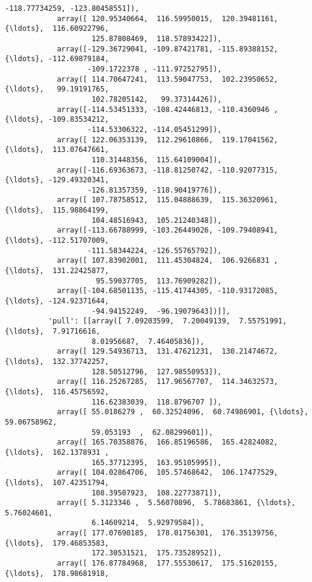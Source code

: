 \documentclass[11pt]{article}
\begin{document}
\begin{Verbatim}[commandchars=\\\{\}]
                   -118.77734259, -123.80458551]),
            array([ 120.95340664,  116.59950015,  120.39481161, {\ldots},  116.60922796,
                    125.87808469,  118.57893422]),
            array([-129.36729041, -109.87421781, -115.89388152, {\ldots}, -112.69879184,
                   -109.1722378 , -111.97252795]),
            array([ 114.70647241,  113.59047753,  102.23950652, {\ldots},   99.19191765,
                    102.78205142,   99.37314426]),
            array([-114.53451333, -108.42446813, -110.4360946 , {\ldots}, -109.83534212,
                   -114.53306322, -114.05451299]),
            array([ 122.06353139,  112.29610866,  119.17041562, {\ldots},  113.07647661,
                    110.31448356,  115.64109004]),
            array([-116.69363673, -118.81250742, -110.92077315, {\ldots}, -129.49320341,
                   -126.81357359, -118.90419776]),
            array([ 107.78758512,  115.04888639,  115.36320961, {\ldots},  115.98864199,
                    104.48516943,  105.21240348]),
            array([-113.66788999, -103.26449026, -109.79408941, {\ldots}, -112.51707009,
                   -111.58344224, -126.55765792]),
            array([ 107.83902001,  111.45304824,  106.9266831 , {\ldots},  131.22425877,
                     95.59037705,  113.76909282]),
            array([-104.68501135, -115.41744305, -110.93172085, {\ldots}, -124.92371644,
                    -94.94152249,  -96.19079643])]],
          'pull': [[array([ 7.09203599,  7.20049139,  7.55751991, {\ldots},  7.91716616,
                    8.01956687,  7.46405836]),
            array([ 129.54936713,  131.47621231,  130.21474672, {\ldots},  132.37742257,
                    128.50512796,  127.98550953]),
            array([ 116.25267285,  117.96567707,  114.34632573, {\ldots},  116.45756592,
                    116.62383039,  118.8796707 ]),
            array([ 55.0186279 ,  60.32524096,  60.74986901, {\ldots},  59.06758962,
                    59.053193  ,  62.08299601]),
            array([ 165.70358876,  166.85196586,  165.42824082, {\ldots},  162.1378931 ,
                    165.37712395,  163.95105995]),
            array([ 104.02864706,  105.57468642,  106.17477529, {\ldots},  107.42351794,
                    108.39507923,  108.22773871]),
            array([ 5.3123346 ,  5.56070896,  5.78683861, {\ldots},  5.76024601,
                    6.14609214,  5.92979584]),
            array([ 177.07690185,  178.01756301,  176.35139756, {\ldots},  179.46853583,
                    172.30531521,  175.73528952]),
            array([ 176.87784968,  177.55530617,  175.51620155, {\ldots},  178.98681918,

\end{Verbatim}
\end{document}
